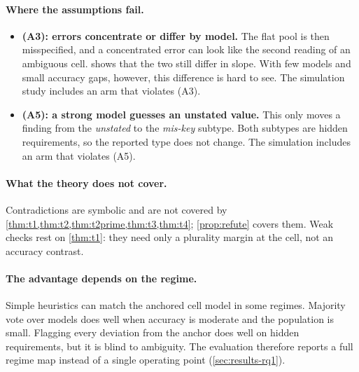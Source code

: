 \paragraph{Where the assumptions fail.}
\begin{itemize}[leftmargin=*]
\item \textbf{(A3): errors concentrate or differ by model.} The flat pool is then misspecified, and a concentrated error can look like the second reading of an ambiguous cell.  shows that the two still differ in slope. With few models and small accuracy gaps, however, this difference is hard to see. The simulation study includes an arm that violates (A3).
\item \textbf{(A5): a strong model guesses an unstated value.} This only moves a finding from the \emph{unstated} to the \emph{mis-key} subtype. Both subtypes are hidden requirements, so the reported type does not change. The simulation includes an arm that violates (A5).
\end{itemize}

\paragraph{What the theory does not cover.} Contradictions are symbolic and are not covered by \cref{thm:t1,thm:t2,thm:t2prime,thm:t3,thm:t4}; \cref{prop:refute} covers them. Weak checks rest on \cref{thm:t1}: they need only a plurality margin at the cell, not an accuracy contrast.

\paragraph{The advantage depends on the regime.} Simple heuristics can match the anchored cell model in some regimes. Majority vote over models does well when accuracy is moderate and the population is small. Flagging every deviation from the anchor does well on hidden requirements, but it is blind to ambiguity. The evaluation therefore reports a full regime map instead of a single operating point (\cref{sec:results-rq1}).
